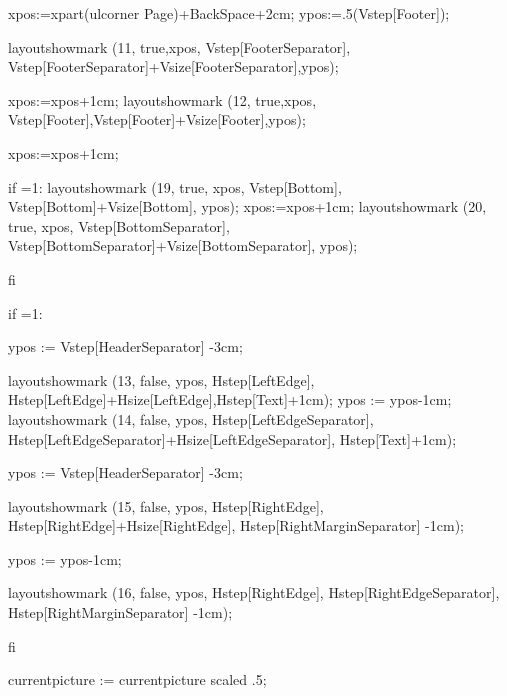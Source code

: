 xpos:=xpart(ulcorner Page)+BackSpace+2cm;
ypos:=.5(Vstep[Footer]);

layoutshowmark (11, true,xpos,
                Vstep[FooterSeparator],
                Vstep[FooterSeparator]+Vsize[FooterSeparator],ypos);

xpos:=xpos+1cm;
layoutshowmark (12, true,xpos,
              Vstep[Footer],Vstep[Footer]+Vsize[Footer],ypos);

xpos:=xpos+1cm;

if =1:
   layoutshowmark (19, true, xpos,
                   Vstep[Bottom],
                   Vstep[Bottom]+Vsize[Bottom], ypos);
   xpos:=xpos+1cm;
   layoutshowmark (20, true, xpos,
                   Vstep[BottomSeparator],
                   Vstep[BottomSeparator]+Vsize[BottomSeparator], ypos);

fi

if =1:

   ypos := Vstep[HeaderSeparator] -3cm;

   layoutshowmark (13, false, ypos,
                   Hstep[LeftEdge],
                   Hstep[LeftEdge]+Hsize[LeftEdge],Hstep[Text]+1cm);
   ypos := ypos-1cm;
   layoutshowmark (14, false, ypos,
                   Hstep[LeftEdgeSeparator],
                   Hstep[LeftEdgeSeparator]+Hsize[LeftEdgeSeparator],
                   Hstep[Text]+1cm);

   ypos := Vstep[HeaderSeparator] -3cm;

   layoutshowmark (15, false, ypos,
                   Hstep[RightEdge],
                   Hstep[RightEdge]+Hsize[RightEdge],
                   Hstep[RightMarginSeparator] -1cm);

   ypos := ypos-1cm;

   layoutshowmark (16, false, ypos,
                   Hstep[RightEdge],
                   Hstep[RightEdgeSeparator],
                   Hstep[RightMarginSeparator] -1cm);

   

fi

currentpicture := currentpicture scaled .5;

\stopuniqueMPgraphic
{}

\def\SetupShowLayout{\dosingleempty\getparameters[ShowLayout]}
\SetupShowLayout[units=pt,digits=1,round=0.1,showmore=0,graphonly=0]

\def\ShowLayout{\dosingleempty\doShowLayout}



